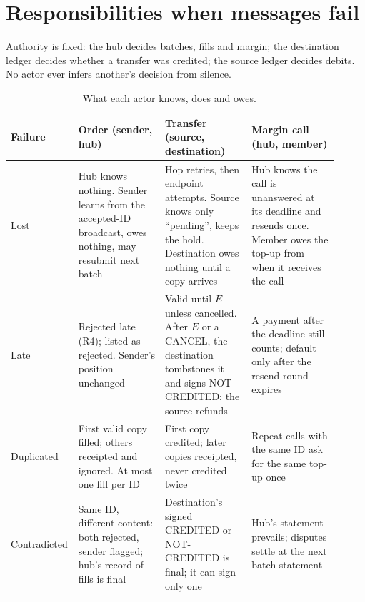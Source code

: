 \section{Responsibilities when messages fail}\label{sec:fail}
Authority is fixed: the hub decides batches, fills and margin; the destination ledger decides whether a transfer was credited; the source ledger decides debits. No actor ever infers another's decision from silence.
\begin{table}[H]
\centering
\caption{What each actor knows, does and owes.}\label{tab:fail}
\small
\begin{tabular}{@{}p{0.13\linewidth}p{0.26\linewidth}p{0.26\linewidth}p{0.26\linewidth}@{}}
\toprule
Failure & Order (sender, hub) & Transfer (source, destination) & Margin call (hub, member) \\
\midrule
Lost & Hub knows nothing. Sender learns from the accepted-ID broadcast, owes nothing, may resubmit next batch & Hop retries, then endpoint attempts. Source knows only ``pending'', keeps the hold. Destination owes nothing until a copy arrives & Hub knows the call is unanswered at its deadline and resends once. Member owes the top-up from when it receives the call \\
Late & Rejected late (R4); listed as rejected. Sender's position unchanged & Valid until $E$ unless cancelled. After $E$ or a CANCEL, the destination tombstones it and signs NOT-CREDITED; the source refunds & A payment after the deadline still counts; default only after the resend round expires \\
Duplicated & First valid copy filled; others receipted and ignored. At most one fill per ID & First copy credited; later copies receipted, never credited twice & Repeat calls with the same ID ask for the same top-up once \\
Contradicted & Same ID, different content: both rejected, sender flagged; hub's record of fills is final & Destination's signed CREDITED or NOT-CREDITED is final; it can sign only one & Hub's statement prevails; disputes settle at the next batch statement \\
\bottomrule
\end{tabular}
\end{table}
\vspace{-6pt}
